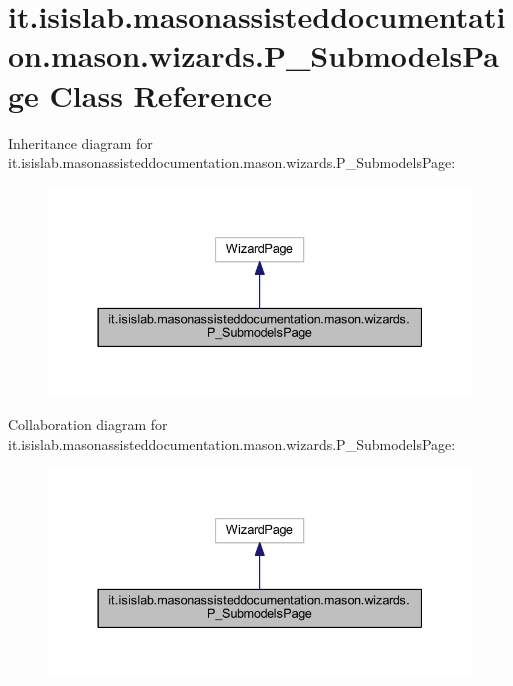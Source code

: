 \hypertarget{classit_1_1isislab_1_1masonassisteddocumentation_1_1mason_1_1wizards_1_1_p___submodels_page}{\section{it.\-isislab.\-masonassisteddocumentation.\-mason.\-wizards.\-P\-\_\-\-Submodels\-Page Class Reference}
\label{classit_1_1isislab_1_1masonassisteddocumentation_1_1mason_1_1wizards_1_1_p___submodels_page}
}


Inheritance diagram for it.\-isislab.\-masonassisteddocumentation.\-mason.\-wizards.\-P\-\_\-\-Submodels\-Page\-:
\nopagebreak
\begin{figure}[H]
\begin{center}
\leavevmode
\includegraphics[width=337pt]{classit_1_1isislab_1_1masonassisteddocumentation_1_1mason_1_1wizards_1_1_p___submodels_page__inherit__graph}
\end{center}
\end{figure}


Collaboration diagram for it.\-isislab.\-masonassisteddocumentation.\-mason.\-wizards.\-P\-\_\-\-Submodels\-Page\-:
\nopagebreak
\begin{figure}[H]
\begin{center}
\leavevmode
\includegraphics[width=337pt]{classit_1_1isislab_1_1masonassisteddocumentation_1_1mason_1_1wizards_1_1_p___submodels_page__coll__graph}
\end{center}
\end{figure}
